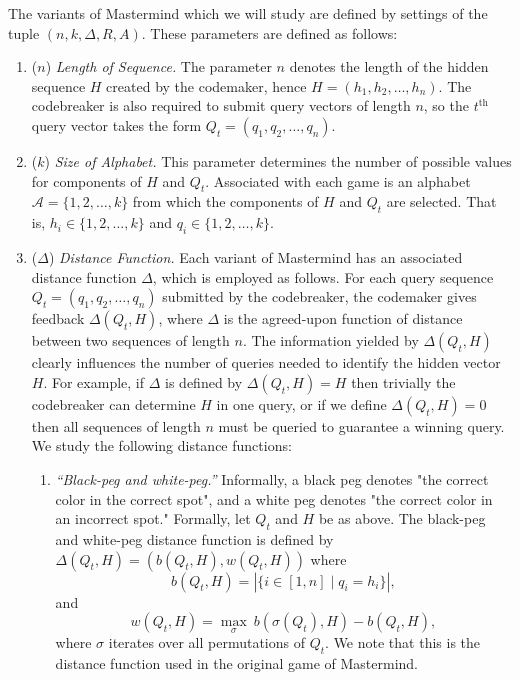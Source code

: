 \documentclass[12pt, a4paper]{article}
\newcommand{\nth}{^{\text{th}}}       %
\begin{document}
The variants of Mastermind which we will study are defined by settings of the tuple $(n, k, \Delta, R, A)$. These parameters are defined as follows:
\begin{enumerate}[label=(\roman*)]
	\item ($n$) \textit{Length of Sequence.} The parameter $n$ denotes the length of the hidden sequence $H$ created by the codemaker, hence $H = (h_1, h_2, \ldots, h_n)$. The codebreaker is also required to submit query vectors of length $n$, so the $t\nth$ query vector takes the form $Q_t = (q_1, q_2, \ldots, q_n)$.
	
	\item ($k$) \textit{Size of Alphabet.} This parameter determines the number of possible values for components of $H$ and $Q_t$. Associated with each game is an alphabet $\mathcal{A} = \{1,2,\ldots,k\}$ from which the components of $H$ and $Q_t$ are selected. That is, $h_i\in\{1,2,\ldots,k\}$ and $q_i\in\{1,2,\ldots,k\}$.
	
	\item($\Delta$) \textit{Distance Function.} Each variant of Mastermind has an associated distance function $\Delta$, which is employed as follows. For each query sequence $Q_t = (q_1, q_2, \ldots, q_n)$ submitted by the codebreaker, the codemaker gives feedback $\Delta(Q_t, H)$, where $\Delta$ is the agreed-upon function of distance between two sequences of length $n$. The information yielded by $\Delta(Q_t, H)$ clearly influences the number of queries needed to identify the hidden vector $H$. For example, if $\Delta$ is defined by $\Delta(Q_t, H) = H$ then trivially the codebreaker can determine $H$ in one query, or if we define $\Delta(Q_t, H) = 0$ then all sequences of length $n$ must be queried to guarantee a winning query. We study the following distance functions:
	\begin{enumerate}[label=\alph*.]
		\item\textit{``Black-peg and white-peg.''} Informally, a black peg denotes "the correct color in the correct spot", and a white peg denotes "the correct color in an incorrect spot." Formally, let $Q_t$ and $H$ be as above. The black-peg and white-peg distance function is defined by $\Delta(Q_t, H) = (b(Q_t, H), w(Q_t, H))$ where
		\begin{equation}\label{blackHitsDefinition}
			b(Q_t, H) = \left|\{i\in [1,n] \mid q_i = h_i\}\right|,
		\end{equation}
		and
		\begin{equation*}\label{whiteHitsDefinition}
			w(Q_t, H) = \max_{\sigma}~b(\sigma(Q_t), H) - b(Q_t, H),
		\end{equation*}
		where $\sigma$ iterates over all permutations of $Q_t$. We note that this is the distance function used in the original game of Mastermind.


\end{enumerate}
\end{enumerate}
\end{document}
